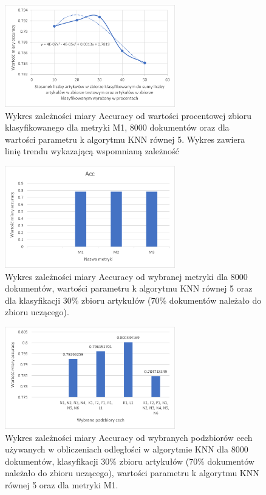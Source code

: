 \documentclass{classrep}
\begin{document}
\begin{figure}[!htbp]
\centering
\includegraphics[width=0.66\textwidth]{wykres6.png}
\caption{Wykres zależności miary Accuracy od wartości procentowej zbioru klasyfikowanego dla metryki M1, 8000 dokumentów oraz dla wartości parametru k algorytmu KNN równej 5. Wykres zawiera linię trendu wykazającą wspomnianą zależność}
\end{figure}

\begin{figure}[!htbp]
\centering
\includegraphics[width=0.66\textwidth]{wykres7.png}
\caption{Wykres zależności miary Accuracy od wybranej metryki dla 8000 dokumentów, wartości parametru k algorytmu KNN równej 5 oraz dla klasyfikacji 30\% zbioru artykułów (70\% dokumentów należało do zbioru uczącego).}
\end{figure}

\begin{figure}[!htbp]
\centering
\includegraphics[width=0.66\textwidth]{wykres8.png}
\caption{Wykres zależności miary Accuracy od wybranych podzbiorów cech używanych w obliczeniach odległości w algorytmie KNN dla 8000 dokumentów, klasyfikacji 30\% zbioru artykułów (70\% dokumentów należało do zbioru uczącego), wartości parametru k algorytmu KNN równej 5 oraz dla metryki M1.}
\end{figure}
\end{document}
